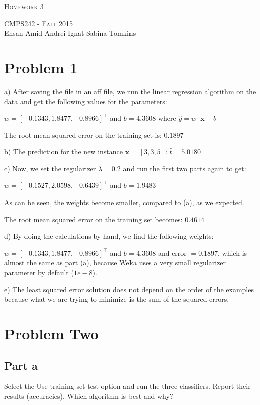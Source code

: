\documentclass{article}
\begin{document}
\begin{center}
\Huge{\textsc{Homework 3}} 

\Large\textsc{CMPS242 - Fall 2015}\\

\large{Ehsan Amid \hfill Andrei Ignat  \hfill Sabina Tomkins} 
\end{center}

\section{Problem 1}

a) After saving the file in an aff file, we run the linear regression algorithm on the data and get the following values for the parameters:

$w = [-0.1343, 1.8477,  -0.8966]^\top$ and $b = 4.3608$ where $\hat{y} = w^\top \mathbf{x} + b$

The root mean squared error on the training set is: $0.1897$\newline

b) The prediction for the new instance $\mathbf{x} = [3, 3, 5]$: $\hat{t} = 5.0180$\newline

c) Now, we set the regularizer $\lambda = 0.2$ and run the first two parts again to get:

$w = [-0.1527, 2.0598, -0.6439]^\top$ and $b = 1.9483$

As can be seen, the weights become smaller, compared to (a), as we expected.

The root mean squared error on the training set becomes: $0.4614$\newline 

d) By doing the calculations by hand, we find the following weights:

$w = [ -0.1343, 1.8477, -0.8966]^\top$ and $b = 4.3608$ and error $= 0.1897$, which is almost the same as part (a), because Weka uses a very small regularizer parameter by default ($1e-8$).\newline

e) The least squared error solution does not depend on the order of the examples because what we are trying to minimize is the sum of the squared errors.\newline

\section{Problem Two}
\subsection{Part a}
Select the Use training set test option and run the three classifiers. Report their results (accuracies). Which algorithm is best and why?
\end{document}
